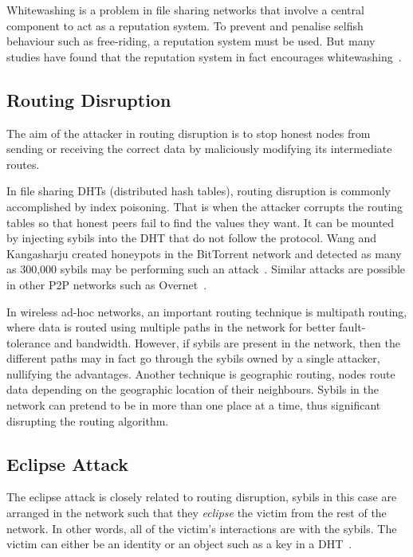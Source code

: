 Whitewashing is a problem in file sharing networks that involve a central
component to act as a reputation system. To prevent and penalise selfish
behaviour such as free-riding, a reputation system must be used. But many
studies have found that the reputation system in fact encourages
whitewashing~\cite{feldman2004free, yang2005empirical}.

\subsection{Routing Disruption}\label{sec:routing-disruption}
The aim of the attacker in routing disruption is to stop honest nodes from
sending or receiving the correct data by maliciously modifying its intermediate
routes.

In file sharing DHTs (distributed hash tables), routing disruption is commonly
accomplished by index poisoning. That is when the attacker corrupts the routing
tables so that honest peers fail to find the values they want. It can be mounted
by injecting sybils into the DHT that do not follow the protocol. Wang and
Kangasharju created honeypots in the BitTorrent network and detected as many as
300,000 sybils may be performing such an attack~\cite{wang2012real}. Similar
attacks are possible in other P2P networks such as
Overnet~\cite{liang2006index}.

In wireless ad-hoc networks, an important routing technique is multipath
routing, where data is routed using multiple paths in the network for better
fault-tolerance and bandwidth. However, if sybils are present in the network,
then the different paths may in fact go through the sybils owned by a single
attacker, nullifying the advantages. Another technique is geographic routing,
nodes route data depending on the geographic location of their neighbours.
Sybils in the network can pretend to be in more than one place at a time, thus
significant disrupting the routing algorithm\cite{karlof2003secure}.

\subsection{Eclipse Attack}
The eclipse attack is closely related to routing disruption, sybils in this case
are arranged in the network such that they \emph{eclipse} the victim from the
rest of the network. In other words, all of the victim's interactions are with
the sybils. The victim can either be an identity or an object such as a key in a
DHT~\cite{singh2006eclipse}.

